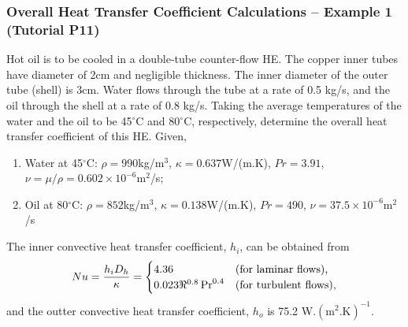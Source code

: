 \documentclass[10pt,compress,unknownkeysallowed]{beamer}
\begin{document}
\begin{frame}
  \frametitle{Overall Heat Transfer Coefficient Calculations -- Example 1 (Tutorial P11)}
Hot oil is to be cooled in a double-tube counter-flow HE. The copper inner tubes have diameter of 2cm and negligible thickness. The inner diameter of the outer tube (shell) is 3cm. Water flows through the tube at a rate of 0.5 kg/s, and the oil through the shell at a rate of 0.8 kg/s. Taking the average temperatures of the water and the oil to be 45$^{\circ}$C and 80$^{\circ}$C, respectively, determine the overall heat transfer coefficient of this HE. Given, 
\begin{enumerate} 
    \item Water at 45$^{\circ}$C: $\rho=990$kg/m$^{3}$, $\kappa=0.637$W/(m.K), $Pr=3.91$, $\nu=\mu/\rho=0.602\times 10^{-6}$m$^{2}$/s; 
    \item Oil at 80$^{\circ}$C: $\rho=852$kg/m$^{3}$, $\kappa=0.138$W/(m.K), $Pr=490$, $\nu=37.5\times 10^{-6}$m$^{2}$/s
\end{enumerate}
The inner convective heat transfer coefficient, $h_{i}$, can be obtained from
\begin{displaymath}
       Nu = \displaystyle\frac{h_{i}D_{h}}{\kappa} =
   \begin{cases}
       4.36  & \text{(for laminar flows),} \\
       0.023\Re^{0.8}\Pr^{0.4} & \text{(for turbulent flows),} \\
   \end{cases}
\end{displaymath}
and the outter convective heat transfer coefficient, $h_{o}$ is 75.2 W.$\left(\text{m}^{2}.\text{K}\right)^{-1}$.

\end{frame}
\end{document}
